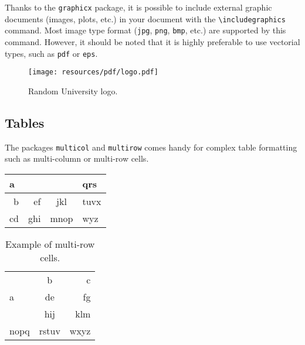 \documentclass[a4paper, 12pt]{report}
\def\tbs{\textbackslash}
\begin{document}
    Thanks to the \texttt{graphicx} package, it is possible to include external graphic documents (images, plots, etc.) in your document with the \texttt{\tbs{}includegraphics} command. Most image type format (\texttt{jpg}, \texttt{png}, \texttt{bmp}, etc.) are supported by this command. However, it should be noted that it is highly preferable to use vectorial types, such as \texttt{pdf} or \texttt{eps}.

    \begin{figure}[h]
        \centering
        \texttt{[image: resources/pdf/logo.pdf]}
        \caption{Random University logo.}
        \label{fig:random_university_logo}
    \end{figure}

    \subsection{Tables}

    The packages \texttt{multicol} and \texttt{multirow} comes handy for complex table formatting such as multi-column or multi-row cells.

    \begin{table}[h]
        \centering
        \begin{tabular}{|r|r|c|l|}
            \hline
            \multicolumn{3}{|l|}{a} & qrs  \\ \hline
             b &  ef &     jkl      & tuvx \\ \hline
            cd & ghi &     mnop     & wyz  \\ \hline
        \end{tabular}
        \label{tab:multicol_example}
    \end{table}

    \begin{table}[h]
        \centering
        \begin{tabular}{|l|c|r|}
            \hline
            \multirow{3}{2cm}{a} &   b   &    c \\ \cline{2-3}
                                 &  de   &   fg \\ \cline{2-3}
                                 &  hij  &  klm \\ \hline
            nopq                 & rstuv & wxyz \\ \hline
        \end{tabular}
        \caption{Example of multi-row cells.}
        \label{tab:multirow_example}
    \end{table}
\end{document}
